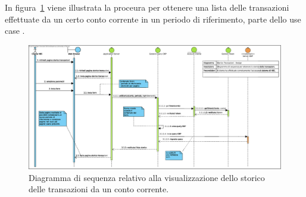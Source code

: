 In figura~\ref{fig:sequenza:storico} viene illustrata la proceura per ottenere una lista delle transazioni effettuate da un certo conto corrente in un periodo di riferimento, parte dello use case \iducVERSTOR.

\begin{figure}[h]
    \centering
	\includegraphics[width=\textheight, angle=90]{Images/Storico_Transazioni_-_Design.eps}
    \caption{Diagramma di sequenza relativo alla visualizzazione dello storico delle transazioni da un conto corrente.}
    \label{fig:sequenza:storico}
\end{figure}

